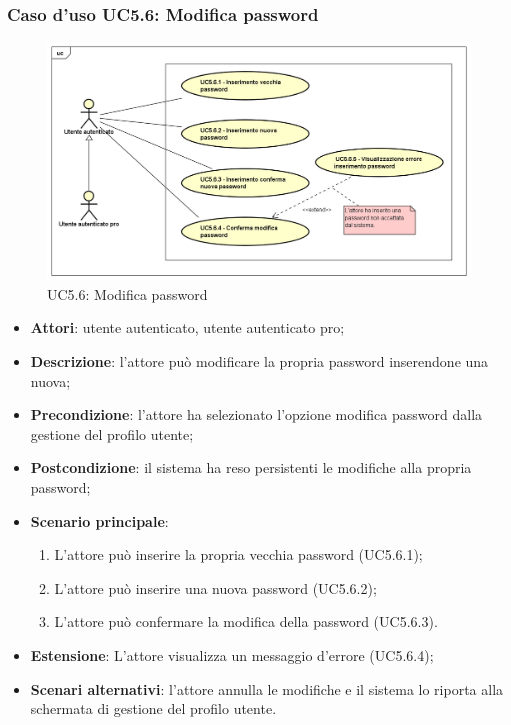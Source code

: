 \subsubsection{Caso d'uso UC5.6: Modifica password}
\label{UC5.6}
\begin{figure}[h]
	\centering
	\includegraphics[scale=0.5,keepaspectratio]{UML/UC5_6.png}
	\caption{UC5.6: Modifica password}
\end{figure}

\begin{itemize}
	\item \textbf{Attori}: utente autenticato, utente autenticato pro;
	\item \textbf{Descrizione}: l'attore può modificare la propria password inserendone una nuova;
	\item \textbf{Precondizione}:  l'attore ha selezionato l'opzione modifica password dalla gestione del profilo utente;
	\item \textbf{Postcondizione}: il sistema ha reso persistenti le modifiche alla propria password;
	\item \textbf{Scenario principale}:
	\begin{enumerate}
		\item L'attore può inserire la propria vecchia password (UC5.6.1);
		\item L'attore può inserire una nuova password (UC5.6.2);
		\item L'attore può confermare la modifica della password (UC5.6.3).
	\end{enumerate}
	\item \textbf{Estensione}: L'attore visualizza un messaggio d'errore (UC5.6.4);
	\item \textbf{Scenari alternativi}: l'attore annulla le modifiche e il sistema lo riporta alla schermata di gestione del profilo utente.
\end{itemize}

